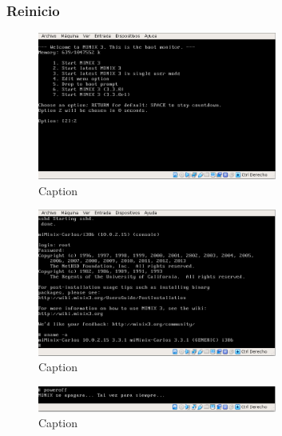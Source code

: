 \documentclass[12pt]{scrartcl}
\begin{document}
\subsubsection{Reinicio}
\begin{figure}[H]
  \centering
  \includegraphics[width=0.7\textwidth]{9.png}
  \caption{Caption}
\end{figure}
\begin{figure}[H]
  \centering
  \includegraphics[width=0.7\textwidth]{10.png}
  \caption{Caption}
\end{figure}
\begin{figure}[H]
  \centering
  \includegraphics[width=0.7\textwidth]{11.png}
  \caption{Caption}
\end{figure}
\end{document}
